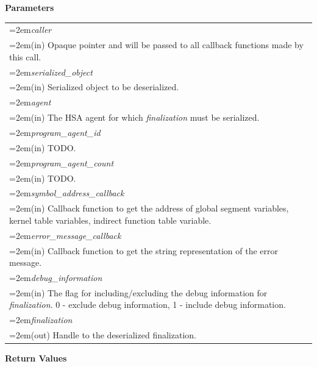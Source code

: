 \documentclass[final]{book}
\newcommand{\hsaarg}[1]{\textit{#1}}
\begin{document}
\noindent\textbf{Parameters}\\[-6mm]
\noindent\begin{longtable}{@{}>{\hangindent=2em}p{\textwidth}}
\hsaarg{caller}\\\hspace{2em}(in) Opaque pointer and will be passed to all callback functions made by this call.\\[2mm]
\hsaarg{serialized_\-object}\\\hspace{2em}(in) Serialized object to be deserialized.\\[2mm]
\hsaarg{agent}\\\hspace{2em}(in) The HSA agent for which \textit{finalization} must be serialized.\\[2mm]
\hsaarg{program_\-agent_\-id}\\\hspace{2em}(in) TODO.\\[2mm]
\hsaarg{program_\-agent_\-count}\\\hspace{2em}(in) TODO.\\[2mm]
\hsaarg{symbol_\-address_\-callback}\\\hspace{2em}(in) Callback function to get the address of global segment variables, kernel table variables, indirect function table variable.\\[2mm]
\hsaarg{error_\-message_\-callback}\\\hspace{2em}(in) Callback function to get the string representation of the error message.\\[2mm]
\hsaarg{debug_\-information}\\\hspace{2em}(in) The flag for including/excluding the debug information for \textit{finalization}. 0 - exclude debug information, 1 - include debug information.\\[2mm]
\hsaarg{finalization}\\\hspace{2em}(out) Handle to the deserialized finalization.
\end{longtable}
\vspace{-5mm}\noindent\textbf{Return Values}\\[-6mm]
\end{document}
